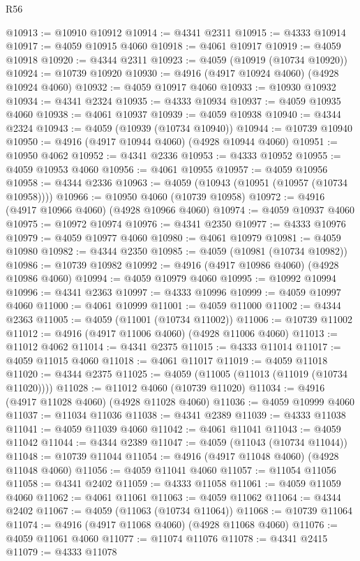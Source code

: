 \begin{lexlean}{R56}
\begin{coremodule}
@10913 := @10910 @10912
@10914 := @4341 @2311
@10915 := @4333 @10914
@10917 := @4059 @10915 @4060
@10918 := @4061 @10917
@10919 := @4059 @10918
@10920 := @4344 @2311
@10923 := @4059 (@10919 (@10734 @10920))
@10924 := @10739 @10920
@10930 := @4916 (@4917 @10924 @4060) (@4928 @10924 @4060)
@10932 := @4059 @10917 @4060
@10933 := @10930 @10932
@10934 := @4341 @2324
@10935 := @4333 @10934
@10937 := @4059 @10935 @4060
@10938 := @4061 @10937
@10939 := @4059 @10938
@10940 := @4344 @2324
@10943 := @4059 (@10939 (@10734 @10940))
@10944 := @10739 @10940
@10950 := @4916 (@4917 @10944 @4060) (@4928 @10944 @4060)
@10951 := @10950 @4062
@10952 := @4341 @2336
@10953 := @4333 @10952
@10955 := @4059 @10953 @4060
@10956 := @4061 @10955
@10957 := @4059 @10956
@10958 := @4344 @2336
@10963 := @4059 (@10943 (@10951 (@10957 (@10734 @10958))))
@10966 := @10950 @4060 (@10739 @10958)
@10972 := @4916 (@4917 @10966 @4060) (@4928 @10966 @4060)
@10974 := @4059 @10937 @4060
@10975 := @10972 @10974
@10976 := @4341 @2350
@10977 := @4333 @10976
@10979 := @4059 @10977 @4060
@10980 := @4061 @10979
@10981 := @4059 @10980
@10982 := @4344 @2350
@10985 := @4059 (@10981 (@10734 @10982))
@10986 := @10739 @10982
@10992 := @4916 (@4917 @10986 @4060) (@4928 @10986 @4060)
@10994 := @4059 @10979 @4060
@10995 := @10992 @10994
@10996 := @4341 @2363
@10997 := @4333 @10996
@10999 := @4059 @10997 @4060
@11000 := @4061 @10999
@11001 := @4059 @11000
@11002 := @4344 @2363
@11005 := @4059 (@11001 (@10734 @11002))
@11006 := @10739 @11002
@11012 := @4916 (@4917 @11006 @4060) (@4928 @11006 @4060)
@11013 := @11012 @4062
@11014 := @4341 @2375
@11015 := @4333 @11014
@11017 := @4059 @11015 @4060
@11018 := @4061 @11017
@11019 := @4059 @11018
@11020 := @4344 @2375
@11025 := @4059 (@11005 (@11013 (@11019 (@10734 @11020))))
@11028 := @11012 @4060 (@10739 @11020)
@11034 := @4916 (@4917 @11028 @4060) (@4928 @11028 @4060)
@11036 := @4059 @10999 @4060
@11037 := @11034 @11036
@11038 := @4341 @2389
@11039 := @4333 @11038
@11041 := @4059 @11039 @4060
@11042 := @4061 @11041
@11043 := @4059 @11042
@11044 := @4344 @2389
@11047 := @4059 (@11043 (@10734 @11044))
@11048 := @10739 @11044
@11054 := @4916 (@4917 @11048 @4060) (@4928 @11048 @4060)
@11056 := @4059 @11041 @4060
@11057 := @11054 @11056
@11058 := @4341 @2402
@11059 := @4333 @11058
@11061 := @4059 @11059 @4060
@11062 := @4061 @11061
@11063 := @4059 @11062
@11064 := @4344 @2402
@11067 := @4059 (@11063 (@10734 @11064))
@11068 := @10739 @11064
@11074 := @4916 (@4917 @11068 @4060) (@4928 @11068 @4060)
@11076 := @4059 @11061 @4060
@11077 := @11074 @11076
@11078 := @4341 @2415
@11079 := @4333 @11078

\end{coremodule}
\end{lexlean}
